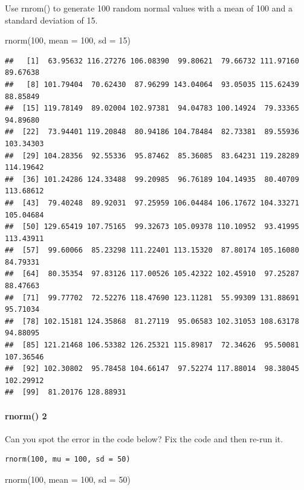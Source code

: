 \documentclass[
]{article}
\newenvironment{Shaded}{\begin{snugshade}}{\end{snugshade}}
\newcommand{\AttributeTok}[1]{\textcolor[rgb]{0.77,0.63,0.00}{#1}}
\newcommand{\DecValTok}[1]{\textcolor[rgb]{0.00,0.00,0.81}{#1}}
\newcommand{\FunctionTok}[1]{\textcolor[rgb]{0.00,0.00,0.00}{#1}}
\newcommand{\NormalTok}[1]{#1}
\begin{document}
Use rnrom() to generate 100 random normal values with a mean of 100 and
a standard deviation of 15.

\begin{Shaded}
\begin{Highlighting}[]
\FunctionTok{rnorm}\NormalTok{(}\DecValTok{100}\NormalTok{, }\AttributeTok{mean =} \DecValTok{100}\NormalTok{, }\AttributeTok{sd =} \DecValTok{15}\NormalTok{)}
\end{Highlighting}
\end{Shaded}

\begin{verbatim}
##   [1]  63.95632 116.27276 106.08390  99.80621  79.66732 111.97160  89.67638
##   [8] 101.79404  70.62430  87.96299 143.04064  93.05035 115.62439  88.85849
##  [15] 119.78149  89.02004 102.97381  94.04783 100.14924  79.33365  94.89680
##  [22]  73.94401 119.20848  80.94186 104.78484  82.73381  89.55936 103.34303
##  [29] 104.28356  92.55336  95.87462  85.36085  83.64231 119.28289 114.19642
##  [36] 101.24286 124.33488  99.20985  96.76189 104.14935  80.40709 113.68612
##  [43]  79.40248  89.92031  97.25959 106.04484 106.17672 104.33271 105.04684
##  [50] 129.65419 107.75165  99.32673 105.09378 110.10952  93.41995 113.43911
##  [57]  99.60066  85.23298 111.22401 113.15320  87.80174 105.16080  84.79331
##  [64]  80.35354  97.83126 117.00526 105.42322 102.45910  97.25287  88.47663
##  [71]  99.77702  72.52276 118.47690 123.11281  55.99309 131.88691  95.71034
##  [78] 102.15181 124.35868  81.27119  95.06583 102.31053 108.63178  94.88095
##  [85] 121.21468 106.53382 126.25321 115.89817  72.34626  95.50081 107.36546
##  [92] 102.30802  95.78458 104.66147  97.52274 117.88014  98.38045 102.29912
##  [99]  81.20176 128.88931
\end{verbatim}

\hypertarget{rnorm-2}{%
\paragraph{rnorm() 2}\label{rnorm-2}}

Can you spot the error in the code below? Fix the code and then re-run
it.

\begin{verbatim}
rnorm(100, mu = 100, sd = 50)
\end{verbatim}

\begin{Shaded}
\begin{Highlighting}[]
\FunctionTok{rnorm}\NormalTok{(}\DecValTok{100}\NormalTok{, }\AttributeTok{mean =} \DecValTok{100}\NormalTok{, }\AttributeTok{sd =} \DecValTok{50}\NormalTok{)}
\end{Highlighting}
\end{Shaded}
\end{document}
